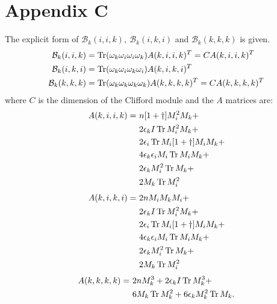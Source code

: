 \section*{Appendix C}
The explicit form of $\mathcal{B}_k(i,i,k), \ \mathcal{B}_k(i,k,i)$ and $\mathcal{B}_k(k,k,k)$ is given.
\begin{align}
\mathcal{B}_k(i,i,k) &= \operatorname{Tr}(\omega_k \omega_i \omega_i \omega_k)A(k, i, i, k)^T = CA(k,i,i,k)^T \\ \notag
\mathcal{B}_k(i,k,i) &= \operatorname{Tr}(\omega_k \omega_i \omega_k \omega_i)A(k, i, k, i)^T \\ \notag
\mathcal{B}_k(k,k,k) &= \operatorname{Tr}(\omega_k \omega_k \omega_k \omega_k)A(k, k, k, k)^T = CA(k,k,k,k)^T
\end{align}
where $C$ is the dimension of the Clifford module and the $A$ matrices are:
\begin{align}
A(k,i,i,k) = \ &n [1+\dagger] M_i^2 M_k + \notag \\
&2\epsilon_k I \operatorname{Tr} M_i^2 M_k + \notag \\
&2\epsilon_i \operatorname{Tr} M_i [1 + \dagger] M_i M_k + \notag \\
&4\epsilon_k \epsilon_i M_i \operatorname{Tr} M_i M_k + \notag \\
&2\epsilon_k M_i^2 \operatorname{Tr} M_k + \notag \\
&2M_k \operatorname{Tr} M_i^2
\end{align}
\begin{align}
A(k,i,k,i) = \ &2n M_i M_k M_i + \notag \\
&2\epsilon_k I \operatorname{Tr} M_i^2 M_k + \notag \\
&2\epsilon_i \operatorname{Tr} M_i [1+\dagger] M_i M_k + \notag \\
&4\epsilon_k \epsilon_i M_i \operatorname{Tr} M_i M_k + \notag \\
&2\epsilon_k M_i^2 \operatorname{Tr} M_k + \notag \\
&2M_k \operatorname{Tr} M_i^2
\end{align}
\begin{align}
A(k,k,k,k) = \ &2n M_k^3 + 2\epsilon_k I \operatorname{Tr} M_k^3 + \notag \\
&6 M_k \operatorname{Tr} M_k^2 + 6\epsilon_k M_k^2 \operatorname{Tr} M_k.
\end{align}





